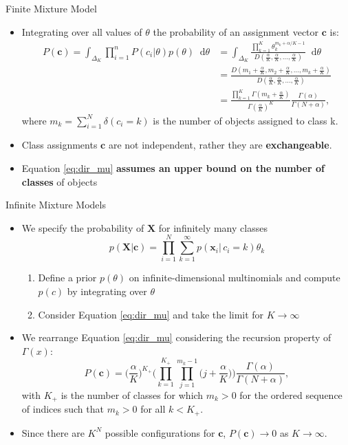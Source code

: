 \documentclass[aspectratio=169,xcolor=dvipsnames]{beamer}
\newcommand*\diff{\mathop{}\!\mathrm{d}}
\newcommand{\vecx}{\textbf{x}}
\newcommand{\vecc}{\textbf{c}}
\newcommand{\matx}{\textbf{X}}
\newcommand{\aOverK}{\frac{\alpha}{K}}
\begin{document}
\begin{frame}{Finite Mixture Model}
\setlength{\leftmargini}{0.2cm}
\begin{itemize}[<+->]
\item Integrating over all values of $\theta$ the probability of an assignment vector $\vecc$ is:
\begin{align}
    P(\vecc) = \int_{\Delta_{K}} \prod_{i=1}^{n} P(c_i| \theta) p(\theta) \diff \theta 
    &= \int_{\Delta_{K}} \frac{\prod_{k=1}^{K}\theta^{m_k + \alpha/K-1}_{k}}{D(\aOverK,\aOverK,\dots,\aOverK)} \diff \theta  \nonumber \\
    &= \frac{D(m_1+\aOverK, m_2+\aOverK,\dots, m_k +\aOverK)}{D(\aOverK,\aOverK,\dots,\aOverK)}  \nonumber\\
    &= \frac{\prod_{k=1}^{K} \Gamma(m_k + \aOverK )}{\Gamma(\aOverK)^{K}} \frac{\Gamma(\alpha)}{\Gamma(N+\alpha)},  \label{eq:dir_mu}
\end{align} 
where $m_k=\sum_{i=1}^{N}\delta(c_i=k)$ is the number of objects assigned to class k.
\item Class assignments $\vecc$ are not independent, rather they are \textbf{exchangeable}.
\item Equation \ref{eq:dir_mu} \textbf{assumes an upper bound on the number of classes} of objects
\end{itemize}
\end{frame}
\begin{frame}{Infinite Mixture Models}
\setlength{\leftmargini}{0.2cm}
\begin{itemize}[<+->]
\item We specify the probability of $\matx$ for infinitely many classes
\begin{equation*}
      p(\matx|\vecc) = \prod_{i=1}^{N} \sum_{k=1}^{\infty} p(\vecx_i| \, c_i=k)\theta_k
\end{equation*}
\begin{enumerate}[<+->]
    \item Define a prior $p(\theta)$ on infinite-dimensional multinomials and compute $p(c)$ by integrating over $\theta$
    \item Consider Equation \ref{eq:dir_mu} and take the limit for $K\rightarrow\infty$
\end{enumerate}
\item We rearrange Equation \ref{eq:dir_mu} considering the recursion property of $\Gamma(x)$:
\begin{equation}
    P(\vecc) = \Big(\aOverK\Big)^{K_+} \bigg( \prod_{k=1}^{K_{+}} \prod_{j=1}^{m_k-1}\Big(j+\aOverK\Big) \bigg) \frac{\Gamma(\alpha)}{\Gamma(N+\alpha)},  \label{eq:pr_c_lim}
\end{equation}
with $K_+$ is the number of classes for which $m_k > 0$ for the ordered sequence
of indices such that $m_k > 0$ for all $k <K_+$.
\item Since there are $K^N$ possible configurations for $\vecc$, $P(\vecc) \rightarrow 0$ as $K \rightarrow \infty$.
\end{itemize}
\end{frame}
\end{document}
